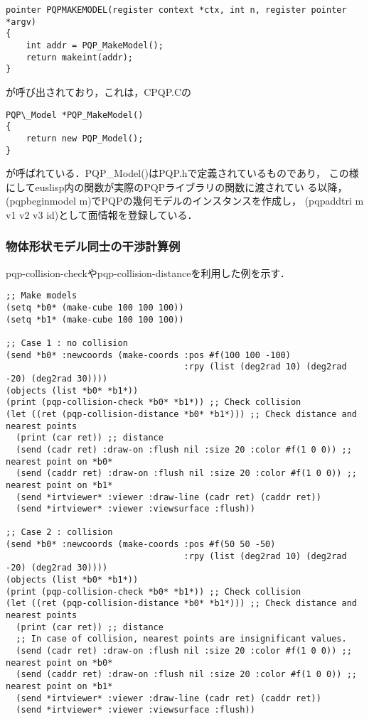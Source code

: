 {\baselineskip=10pt
\begin{verbatim}
pointer PQPMAKEMODEL(register context *ctx, int n, register pointer *argv)
{
    int addr = PQP_MakeModel();
    return makeint(addr);
}
\end{verbatim}
}

が呼び出されており，これは，CPQP.Cの
{\baselineskip=10pt
\begin{verbatim}
PQP\_Model *PQP_MakeModel()
{
    return new PQP_Model();
}
\end{verbatim}
}
が呼ばれている．PQP\_Model()はPQP.hで定義されているものであり，
この様にしてeuslisp内の関数が実際のPQPライブラリの関数に渡されてい
る以降，(pqpbeginmodel m)でPQPの幾何モデルのインスタンスを作成し，
(pqpaddtri m v1 v2 v3 id)として面情報を登録している．

\subsubsection{物体形状モデル同士の干渉計算例}
pqp-collision-checkやpqp-collision-distanceを利用した例を示す．
{\baselineskip=10pt
\begin{verbatim}
;; Make models
(setq *b0* (make-cube 100 100 100))
(setq *b1* (make-cube 100 100 100))

;; Case 1 : no collision
(send *b0* :newcoords (make-coords :pos #f(100 100 -100)
                                   :rpy (list (deg2rad 10) (deg2rad -20) (deg2rad 30))))
(objects (list *b0* *b1*))
(print (pqp-collision-check *b0* *b1*)) ;; Check collision
(let ((ret (pqp-collision-distance *b0* *b1*))) ;; Check distance and nearest points
  (print (car ret)) ;; distance
  (send (cadr ret) :draw-on :flush nil :size 20 :color #f(1 0 0)) ;; nearest point on *b0*
  (send (caddr ret) :draw-on :flush nil :size 20 :color #f(1 0 0)) ;; nearest point on *b1*
  (send *irtviewer* :viewer :draw-line (cadr ret) (caddr ret))
  (send *irtviewer* :viewer :viewsurface :flush))

;; Case 2 : collision
(send *b0* :newcoords (make-coords :pos #f(50 50 -50)
                                   :rpy (list (deg2rad 10) (deg2rad -20) (deg2rad 30))))
(objects (list *b0* *b1*))
(print (pqp-collision-check *b0* *b1*)) ;; Check collision
(let ((ret (pqp-collision-distance *b0* *b1*))) ;; Check distance and nearest points
  (print (car ret)) ;; distance
  ;; In case of collision, nearest points are insignificant values.
  (send (cadr ret) :draw-on :flush nil :size 20 :color #f(1 0 0)) ;; nearest point on *b0*
  (send (caddr ret) :draw-on :flush nil :size 20 :color #f(1 0 0)) ;; nearest point on *b1*
  (send *irtviewer* :viewer :draw-line (cadr ret) (caddr ret))
  (send *irtviewer* :viewer :viewsurface :flush))
\end{verbatim}
}

